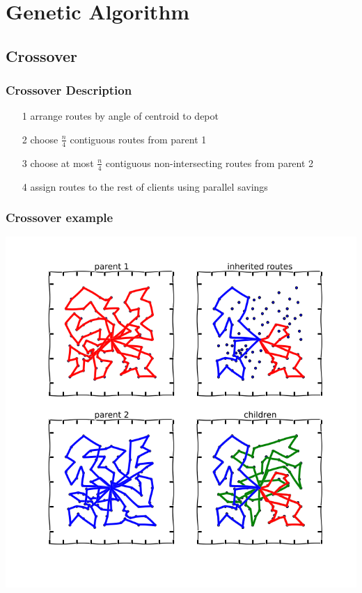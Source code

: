 \documentclass{beamer}
\begin{document}
\section{Genetic Algorithm}




\subsection{Crossover}

\begin{frame}
\frametitle{Crossover Description}

\begin{itemize}
	\item[1] arrange routes by angle of centroid to depot
	\item[2] choose $\frac{n}{4}$ contiguous routes from parent 1
	\item[3] choose at most $\frac{n}{4}$ contiguous non-intersecting routes from parent 2
	\item[4] assign routes to the rest of clients using parallel savings 
\end{itemize}

\end{frame}



\begin{frame}
\frametitle{Crossover example}
\begin{center}
\includegraphics[scale=0.25]{figs/crossover}

\end{center}

\begin{center}
\end{center}
\end{frame}
\end{document}
